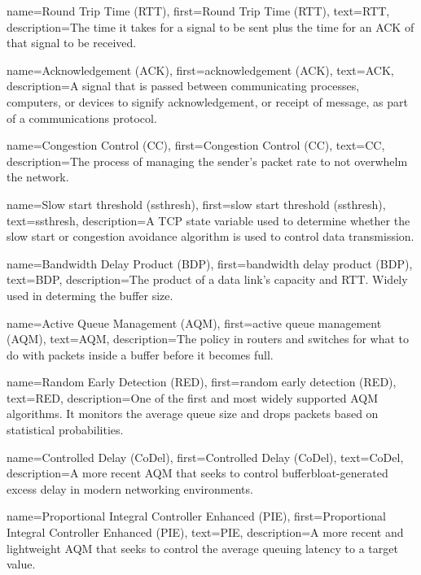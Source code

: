 {
    name={Round Trip Time (RTT)},
    first={Round Trip Time (RTT)},
    text={RTT},
    description={The time it takes for a signal to be sent plus the time for an ACK of that signal to be received.}
}

{
    name={Acknowledgement (ACK)},
    first={acknowledgement (ACK)},
    text={ACK},
    description={A signal that is passed between communicating processes, computers, or devices to signify acknowledgement, or receipt of message, as part of a communications protocol.}
}

{
    name={Congestion Control (CC)},
    first={Congestion Control (CC)},
    text={CC},
    description={The process of managing the sender's packet rate to not overwhelm the network.}
}

{
    name={Slow start threshold (ssthresh)},
    first={slow start threshold (ssthresh)},
    text={ssthresh},
    description={A TCP state variable used to determine whether the slow start or congestion avoidance algorithm is used to control data transmission.}
}

{
    name={Bandwidth Delay Product (BDP)},
    first={bandwidth delay product (BDP)},
    text={BDP},
    description={The product of a data link's capacity and RTT. Widely used in determing the buffer size.}
}

{
    name={Active Queue Management (AQM)},
    first={active queue management (AQM)},
    text={AQM},
    description={The policy in routers and switches for what to do with packets inside a buffer before it becomes full.}
}

{
    name={Random Early Detection (RED)},
    first={random early detection (RED)},
    text={RED},
    description={One of the first and most widely supported AQM algorithms. It monitors the average queue size and drops packets based on statistical probabilities.}
}

{
    name={Controlled Delay (CoDel)},
    first={Controlled Delay (CoDel)},
    text={CoDel},
    description={A more recent AQM that seeks to control bufferbloat-generated excess delay in modern
    networking environments.}
}

{
    name={Proportional Integral Controller Enhanced (PIE)},
    first={Proportional Integral Controller Enhanced (PIE)},
    text={PIE},
    description={A more recent and lightweight AQM that seeks to control the average queuing latency to a target value.}
}


